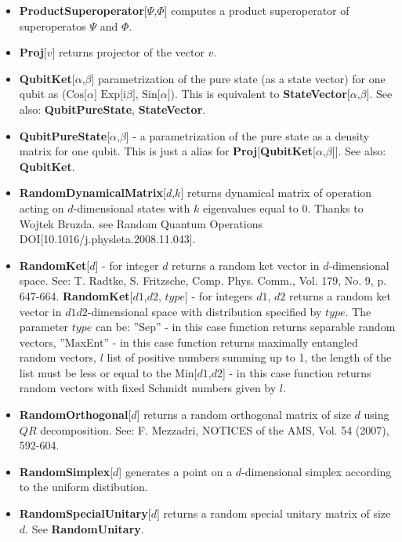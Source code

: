 \documentclass[a4paper,10pt]{scrartcl}
\begin{document}
\begin{itemize}
\item  \textbf{ProductSuperoperator}[$\Psi$,$\Phi$] computes a product superoperator of superoperatos $\Psi$ and $\Phi$.
\item  \textbf{Proj}[$v$] returns projector of the vector $v$.
\item  \textbf{QubitKet}[$\alpha$,$\beta$] parametrization of the pure state (as a state vector) for one qubit as ($\text{Cos[$\alpha $] Exp[i$\beta $], Sin[$\alpha $]}$). This is equivalent to \textbf{StateVector}[{$\text{$\alpha $,$\beta $}$}]. See also: \textbf{QubitPureState}, \textbf{StateVector}.
\item  \textbf{QubitPureState}[$\text{$\alpha $,$\beta $}$] - a parametrization of the pure state as a density matrix for one qubit. This is just a alias for \textbf{Proj}[\textbf{QubitKet}[$\text{$\alpha $,$\beta $}$]]. See also: \textbf{QubitKet}.
\item  \textbf{RandomDynamicalMatrix}[$d$,$k$] returns dynamical matrix of operation acting on $d$-dimensional states with $k$ eigenvalues equal to 0. Thanks to Wojtek Bruzda. see Random Quantum Operations DOI[10.1016/j.physleta.2008.11.043].
\item  \textbf{RandomKet}[$d$] - for integer $d$ returns a random ket vector in $d$-dimensional space. See: T. Radtke, S. Fritzsche, Comp. Phys. Comm., Vol. 179, No. 9, p. 647-664. \newline{}
\textbf{RandomKet}[{$d1$,$d2$}, $type$] - for integers $d1$, $d2$ returns a random ket vector in $d1 d2$-dimensional space with distribution specified by $type$. \newline{}
The parameter $type$ can be:\newline{}
\indent{} ''Sep'' - in this case function returns separable random vectors,\newline{}
\indent{} ''MaxEnt'' - in this case function returns maximally entangled random vectors,\newline{}
\indent{} $l$ list of positive numbers summing up to 1, the length of the list must be less or equal to the Min[$d1$,$d2$] - in this case function returns random vectors with fixed Schmidt numbers given by $l$.
\item  \textbf{RandomOrthogonal}[$d$] returns a random orthogonal matrix of size $d$ using $QR$ decomposition. See: F. Mezzadri, NOTICES of the AMS, Vol. 54 (2007), 592-604.
\item  \textbf{RandomSimplex}[$d$] generates a point on a $d$-dimensional simplex according to the uniform distibution.
\item  \textbf{RandomSpecialUnitary}[$d$] returns a random special unitary matrix of size $d$. See \textbf{RandomUnitary}.

\end{itemize}
\end{document}
